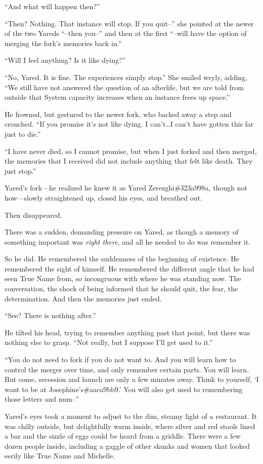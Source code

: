 ``And what will happen then?''

``Then? Nothing. That instance will stop. If you quit--'' she pointed at the newer of the two Yareds ``--then you--'' and then at the first ``--will have the option of merging the fork's memories back in.''

``Will I feel anything? Is it like dying?''

``No, Yared. It is fine. The experiences simply stop.'' She smiled wryly, adding, ``We still have not answered the question of an afterlife, but we are told from outside that System capacity increases when an instance frees up space.''

He frowned, but gestured to the newer fork, who backed away a step and crouched. ``If you promise it's not like dying. I can't\ldots I can't have gotten this far just to die.''

``I have never died, so I cannot promise, but when I just forked and then merged, the memories that I received did not include anything that felt like death. They just stop.''

Yared's fork---he realized he knew it as Yared Zerezghi\#323a998a, though not how---slowly straightened up, closed his eyes, and breathed out.

Then disappeared.

There was a sudden, demanding pressure on Yared, as though a memory of something important was \emph{right there}, and all he needed to do was remember it.

So he did. He remembered the suddenness of the beginning of existence. He remembered the sight of himself. He remembered the different angle that he had seen True Name from, so incongruous with where he was standing now. The conversation, the shock of being informed that he should quit, the fear, the determination. And then the memories just ended.

``See? There is nothing after.''

He tilted his head, trying to remember anything past that point, but there was nothing else to grasp. ``Not really, but I suppose I'll get used to it.''

``You do not need to fork if you do not want to. And you will learn how to control the merger over time, and only remember certain parts. You will learn. But come, secession and launch are only a few minutes away. Think to yourself, `I want to be at Josephine's\#aaca9bb9.' You will also get used to remembering those letters and num--''

Yared's eyes took a moment to adjust to the dim, steamy light of a restaurant. It was chilly outside, but delightfully warm inside, where silver and red stools lined a bar and the sizzle of eggs could be heard from a griddle. There were a few dozen people inside, including a gaggle of other skunks and women that looked eerily like True Name and Michelle.

